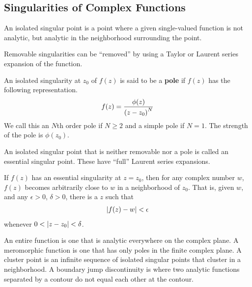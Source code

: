     \subsection{Singularities of Complex Functions}
    An isolated singular point is a point where a given single-valued
    function is not analytic, but analytic in the neighborhood surrounding
    the point.

    Removable singularities can be ``removed'' by using a Taylor or Laurent
    series expansion of the function.

    An isolated singularity at $z_0$ of $f(z)$ is said to be a \textbf{pole}
    if $f(z)$ has the following representation.
    \begin{align*}
        f(z) = \frac{\phi(z)}{{\left( z - z_0 \right)}^N}
    \end{align*}
    We call this an $N$th order pole if $N\ge2$ and a simple pole if $N=1$. The
    strength of the pole is $\phi(z_0)$.

    An isolated singular point that is neither removable nor a pole is
    called an essential singular point. These have ``full'' Laurent series
    expansions.
    \begin{thm}
        If $f(z)$ has an essential singularity at $z=z_0$, then for any
        complex number $w$, $f(z)$ becomes arbitrarily close to $w$ in a
        neighborhood of $z_0$. That is, given $w$, and any $\epsilon > 0$,
        $\delta > 0$, there is a $z$ such that
        \begin{align*}
            \left\lvert f(z) - w \right\rvert < \epsilon
        \end{align*}
        whenever $0 < \left\lvert z - z_0 \right\rvert < \delta$.
    \end{thm}
    An entire function is one that is analytic everywhere on the complex
    plane. A meromorphic function is one that has only poles in the finite
    complex plane.  A cluster point is an infinite sequence of isolated
    singular points that cluster in a neighborhood.  A boundary jump
    discontinuity is where two analytic functions separated by a contour do
    not equal each other at the contour.

